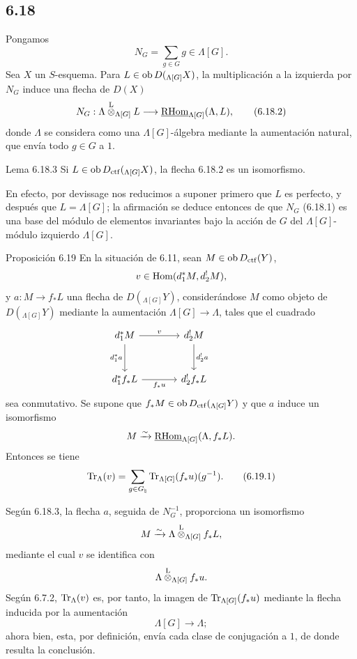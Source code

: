 \subsection*{6.18}
Pongamos
\begin{equation}
N_G=\sum_{g\in G} g\in\Lambda[G].
\tag{6.18.1}
\end{equation}
Sea $X$ un $S$-esquema. Para $L\in\operatorname{ob} D({}_{\Lambda[G]}X)$, la multiplicación a la izquierda por $N_G$ induce una flecha de $D(X)$
\begin{equation}
N_G:\Lambda\overset{\mathrm L}{\otimes}_{\Lambda[G]}L
\longrightarrow
\underline{\mathrm{RHom}}_{\Lambda[G]}(\Lambda,L),
\tag{6.18.2}
\end{equation}
donde $\Lambda$ se considera como una $\Lambda[G]$-álgebra mediante la aumentación natural, que envía todo $g\in G$ a $1$.

\begin{statement}{Lema 6.18.3}
Si $L\in\operatorname{ob} D_{\mathrm{ctf}}({}_{\Lambda[G]}X)$, la flecha 6.18.2 es un isomorfismo.
\end{statement}

En efecto, por devissage nos reducimos a suponer primero que $L$ es perfecto, y después que $L=\Lambda[G]$; la afirmación se deduce entonces de que $N_G$ (6.18.1) es una base del módulo de elementos invariantes bajo la acción de $G$ del $\Lambda[G]$-módulo izquierdo $\Lambda[G]$.

\begin{statement}{Proposición 6.19}
En la situación de 6.11, sean $M\in\operatorname{ob} D_{\mathrm{ctf}}(Y)$,
\[
v\in\operatorname{Hom}(d_1^*M,d_2^!M),
\]
y $a:M\to f_*L$ una flecha de $D({}_{\Lambda[G]}Y)$, considerándose $M$ como objeto de $D({}_{\Lambda[G]}Y)$ mediante la aumentación $\Lambda[G]\to\Lambda$, tales que el cuadrado
\[
\begin{tikzcd}[column sep=large,row sep=large]
d_1^*M \arrow[r,"v"] \arrow[d,"d_1^*a"'] & d_2^!M \arrow[d,"d_2^!a"] & {}\\
d_1^*f_*L \arrow[r,"f_*u"'] & d_2^!f_*L
\end{tikzcd}
\]
sea conmutativo. Se supone que $f_*M\in\operatorname{ob} D_{\mathrm{ctf}}({}_{\Lambda[G]}Y)$ y que $a$ induce un isomorfismo
\[
M\xrightarrow{\sim}\underline{\mathrm{RHom}}_{\Lambda[G]}(\Lambda,f_*L).
\]
Entonces se tiene
\begin{equation}
\operatorname{Tr}_{\Lambda}(v)=
\sum_{g\in G_{\natural}}\operatorname{Tr}_{\Lambda[G]}(f_*u)(g^{-1}).
\tag{6.19.1}
\end{equation}
\end{statement}

Según 6.18.3, la flecha $a$, seguida de $N_G^{-1}$, proporciona un isomorfismo
\[
M\xrightarrow{\sim}\Lambda\overset{\mathrm L}{\otimes}_{\Lambda[G]}f_*L,
\]
mediante el cual $v$ se identifica con
\[
\Lambda\overset{\mathrm L}{\otimes}_{\Lambda[G]}f_*u.
\]
Según 6.7.2, $\operatorname{Tr}_{\Lambda}(v)$ es, por tanto, la imagen de $\operatorname{Tr}_{\Lambda[G]}(f_*u)$ mediante la flecha inducida por la aumentación
\[
\Lambda[G]\longrightarrow \Lambda;
\]
ahora bien, esta, por definición, envía cada clase de conjugación a $1$, de donde resulta la conclusión.
